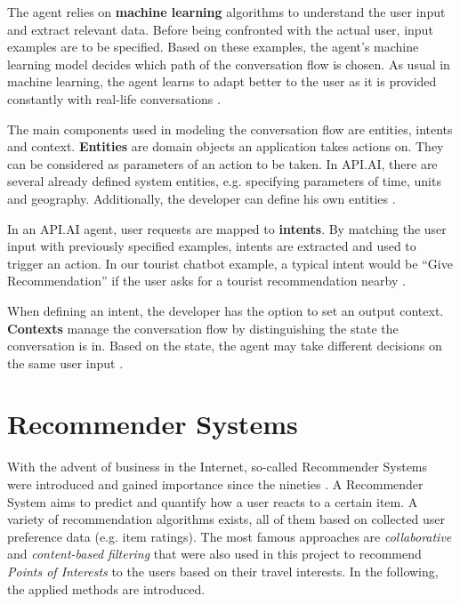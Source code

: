 The agent relies on \textbf{machine learning} algorithms to understand the user input and extract relevant data. Before being confronted with the actual user, input examples are to be specified. Based on these examples, the agent’s machine learning model decides which path of the conversation flow is chosen. As usual in machine learning, the agent learns to adapt better to the user as it is provided constantly with real-life conversations \cite{apiai:ml}. 

The main components used in modeling the conversation flow are entities, intents and context.  \textbf{Entities} are domain objects an application takes actions on. They can be considered as parameters of an action to be taken. In API.AI, there are several already defined system entities, e.g. specifying parameters of time, units and geography. Additionally, the developer can define his own entities \cite{apiai:entities}. 

In an API.AI agent, user requests are mapped to  \textbf{intents}. By matching the user input with previously specified examples, intents are extracted and used to trigger an action. In our tourist chatbot example, a typical intent would be “Give Recommendation” if the user asks for a tourist recommendation nearby \cite{apiai:intents}.
 
When defining an intent, the developer has the option to set an output context.  \textbf{Contexts} manage the conversation flow by distinguishing the state the conversation is in. Based on the state, the agent may take different decisions on the same user input \cite{apiai:contexts}. 


\section{Recommender Systems}

With the advent of business in the Internet, so-called Recommender Systems were introduced and gained importance since the nineties \cite{aggarwal16}.  A Recommender System aims to predict and quantify how a user reacts to a certain item. A variety of recommendation algorithms exists, all of them based on collected user preference data (e.g. item ratings). The most famous approaches are \textit{collaborative} and \textit{content-based filtering} that were also used in this project to recommend \textit{Points of Interests} to the users based on their travel interests. In the following, the applied methods are introduced.

